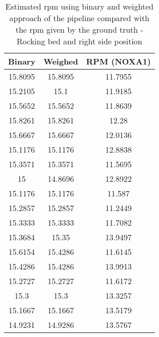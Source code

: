 \begin{table}[h]
    \centering
    \begin{tabular}{|c|c|c|}
 
    \hline 
    Binary & Weighed &RPM (NOXA1) \\ 
    \hline 
15.8095    &  15.8095   &   11.7955 \\ 
15.2105    &     15.1  &    11.9185 \\ 
15.5652    &  15.5652 &     11.8639 \\ 
15.8261    &  15.8261    &    12.28 \\ 
15.6667    &  15.6667   &  12.0136 \\ 
15.1176   &   15.1176   &   12.8838 \\ 
15.3571   &   15.3571  &    11.5695 \\ 
15    &  14.8696   &   12.8922 \\ 
15.1176  &    15.1176  &     11.587 \\ 
15.2857   &   15.2857  &    11.2449 \\ 
15.3333   &   15.3333   &   11.7082 \\ 
15.3684    &    15.35   &   13.9497 \\ 
15.6154    &  15.4286   &   11.6145 \\ 
15.4286    &  15.4286  &    13.9913 \\ 
15.2727    &  15.2727   &   11.6172 \\ 
15.3      &  15.3    &  13.3257 \\ 
15.1667   &   15.1667  &    13.5179 \\ 
14.9231   &   14.9286   &   13.5767 \\ 
\hline 
\end{tabular}
\caption{Estimated rpm using binary and weighted approach of the pipeline
compared with the rpm given by the ground truth - Rocking bed and right side position}
\label{tab:RightMov}

\end{table}
